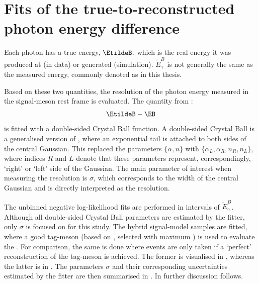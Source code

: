 \chapter{Fits of the true-to-reconstructed photon energy difference}\label{sec:appendix_resolution_fits}

Each photon has a true energy, $\EtildeB$, which is the real energy it was produced at (in data) or generated (simulation).
$\tilde{E}_{\gamma}^B$ is not generally the same as the measured energy, commonly denoted as \EB in this thesis.

Based on these two quantities, the resolution of the photon energy measured in the signal-\B meson rest frame is evaluated.
The quantity from :
\begin{equation}
    \EtildeB - \EB
\end{equation}
is fitted with a double-sided Crystal Ball function.
A double-sided Crystal Ball is a generalised version of , where an exponential tail is attached to both sides of the central Gaussian.
This replaced the parameters $\{\alpha,n\}$ with $\{\alpha_L,\alpha_R, n_R, n_L\}$, where indices $R$ and $L$ denote that these parameters represent, correspondingly, `right' or `left' side of the Gaussian.
The main parameter of interest when measuring the resolution is $\sigma$, which corresponds to the width of the central Gaussian and is directly interpreted as the resolution.

The unbinned negative log-likelihood fits are performed in intervals of $\tilde{E}_{\gamma}^B$.
Although all double-sided Crystal Ball parameters are estimated by the fitter, only $\sigma$ is focused on for this study.
The hybrid signal-model samples are fitted, where a good tag-\B meson (based on , selected with maximum \feiProb) is used to evaluate the \EB.
For comparison, the same is done where events are only taken if a `perfect' reconstruction of the tag-\B meson is achieved.
The former is visualised in , whereas the latter is in .
The parameters $\sigma$ and their corresponding uncertainties estimated by the fitter are then summarised in .
In  further discussion follows.

